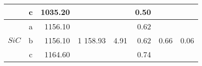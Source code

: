 \begin{table}[H]
{\begin{tabular}{|c|c|r|r|r|r|r|r|}
                                                                                                     & c        & 1035.20                                                                       &                                                                                     &                                                                                       & 0.50                                                                          &                                                                                     &                                                                                       \\ \hline
    \multirow{3}{*}{$SiC$}                                                                           & a        & 1156.10                                                                       & \multirow{3}{*}{1 158.93}                                                           & \multirow{3}{*}{4.91}                                                                 & 0.62                                                                          & \multirow{3}{*}{0.66}                                                               & \multirow{3}{*}{0.06}                                                                 \\ \cline{2-3} \cline{6-6}
                                                                                                     & b        & 1156.10                                                                       &                                                                                     &                                                                                       & 0.62                                                                          &                                                                                     &                                                                                       \\ \cline{2-3} \cline{6-6}
                                                                                                     & c        & 1164.60                                                                       &                                                                                     &                                                                                       & 0.74                                                                          &                                                                                     &                                                                                       \\ \hline

\end{tabular}}
\end{table}
